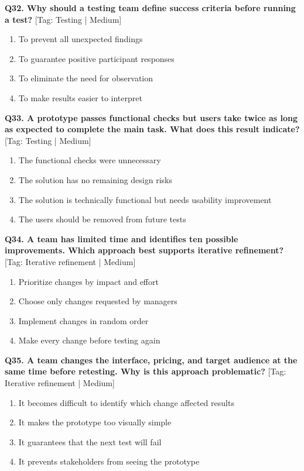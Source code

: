 \noindent\textbf{Q32. Why should a testing team define success criteria before running a test?} \hfill [Tag: Testing | Medium]
\begin{enumerate}[label=(\alph*),topsep=2pt,itemsep=1pt,partopsep=0pt,parsep=0pt]
    \item {To prevent all unexpected findings}
    \item {To guarantee positive participant responses}
    \item {To eliminate the need for observation}
    \item {To make results easier to interpret}
\end{enumerate}
\vspace{2mm}

\noindent\textbf{Q33. A prototype passes functional checks but users take twice as long as expected to complete the main task. What does this result indicate?} \hfill [Tag: Testing | Medium]
\begin{enumerate}[label=(\alph*),topsep=2pt,itemsep=1pt,partopsep=0pt,parsep=0pt]
    \item {The functional checks were unnecessary}
    \item {The solution has no remaining design risks}
    \item {The solution is technically functional but needs usability improvement}
    \item {The users should be removed from future tests}
\end{enumerate}
\vspace{2mm}

\noindent\textbf{Q34. A team has limited time and identifies ten possible improvements. Which approach best supports iterative refinement?} \hfill [Tag: Iterative refinement | Medium]
\begin{enumerate}[label=(\alph*),topsep=2pt,itemsep=1pt,partopsep=0pt,parsep=0pt]
    \item {Prioritize changes by impact and effort}
    \item {Choose only changes requested by managers}
    \item {Implement changes in random order}
    \item {Make every change before testing again}
\end{enumerate}
\vspace{2mm}

\noindent\textbf{Q35. A team changes the interface, pricing, and target audience at the same time before retesting. Why is this approach problematic?} \hfill [Tag: Iterative refinement | Medium]
\begin{enumerate}[label=(\alph*),topsep=2pt,itemsep=1pt,partopsep=0pt,parsep=0pt]
    \item {It becomes difficult to identify which change affected results}
    \item {It makes the prototype too visually simple}
    \item {It guarantees that the next test will fail}
    \item {It prevents stakeholders from seeing the prototype}
\end{enumerate}
\vspace{2mm}

